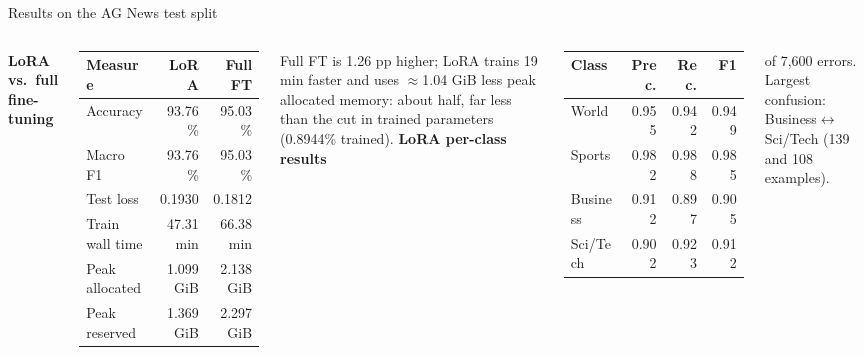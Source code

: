 \documentclass[aspectratio=169,10pt]{beamer}
\gdef\srctext{}
\newcommand{\src}[1]{\gdef\srctext{#1}}
\begin{document}
\begin{frame}{Results on the AG News test split}
	\begin{columns}[T]
		\centering\small\textbf{LoRA vs.\ full fine-tuning}\par\smallskip
		\begin{tabular}{lrr}\toprule
			Measure         & LoRA      & Full FT   \\\midrule
			Accuracy        & 93.76\%   & 95.03\%   \\
			Macro F1        & 93.76\%   & 95.03\%   \\
			Test loss       & 0.1930    & 0.1812    \\
			Train wall time & 47.31 min & 66.38 min \\
			Peak allocated  & 1.099 GiB & 2.138 GiB \\
			Peak reserved   & 1.369 GiB & 2.297 GiB \\\bottomrule
		\end{tabular}
		\par\raggedright\smallskip Full FT is 1.26 pp higher; LoRA trains 19 min faster and uses $\approx$1.04 GiB less peak allocated memory: about half, far less than the cut in trained parameters (0.8944\% trained).
		\centering\small\textbf{LoRA per-class results}\par\smallskip
		\begin{tabular}{lrrr}\toprule
			Class    & Prec. & Rec.  & F1    \\\midrule
			World    & 0.955 & 0.942 & 0.949 \\
			Sports   & 0.982 & 0.988 & 0.985 \\
			Business & 0.912 & 0.897 & 0.905 \\
			Sci/Tech & 0.902 & 0.923 & 0.912 \\\bottomrule
		\end{tabular}
		\par\raggedright{} of 7,600 errors. Largest confusion: Business$\leftrightarrow$Sci/Tech (139 and 108 examples).
	\end{columns}
	\src{metrics.csv, classification\_report.csv, predictions.csv, baseline\_results.csv.}\end{frame}
\end{document}
